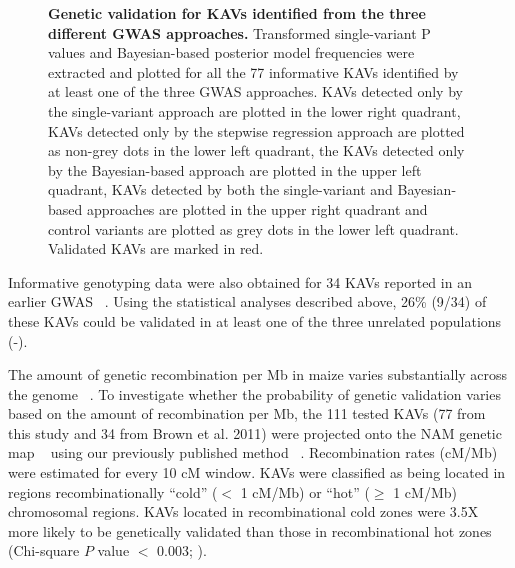\documentclass[10pt,letterpaper]{article}
\begin{document}
\begin{figure}[h]
\caption{{\bf Genetic validation for KAVs identified from the three different GWAS approaches.}
Transformed single-variant P values and Bayesian-based posterior model frequencies were extracted and plotted for all the 77 informative KAVs identified by at least one of the three GWAS approaches. KAVs detected only by the single-variant approach are plotted in the lower right quadrant, KAVs detected only by the stepwise regression approach are plotted as non-grey dots in the lower left quadrant, the KAVs detected only by the Bayesian-based approach are plotted in the upper left quadrant, KAVs detected by both the single-variant and Bayesian-based approaches are plotted in the upper right quadrant and control variants are plotted as grey dots in the lower left quadrant. Validated KAVs are marked in red.}
\label{fig4}
\end{figure}

Informative genotyping data were also obtained for 34 KAVs reported in an earlier GWAS ~\cite{Brown2011}. Using the statistical analyses described above, 26\% (9/34) of these KAVs could be validated in at least one of the three unrelated populations (-).

The amount of genetic recombination per Mb in maize varies substantially across the genome ~\cite{Fu2002}. To investigate whether the probability of genetic validation varies based on the amount of recombination per Mb, the 111 tested KAVs (77 from this study and 34 from Brown et al. 2011) were projected onto the NAM genetic map ~\cite{Buckler2009} using our previously published method ~\cite{Liu2009}. Recombination rates (cM/Mb) were estimated for every 10 cM window. KAVs were classified as being located in regions recombinationally “cold” ($<$ 1 cM/Mb) or “hot” ($\geq$ 1 cM/Mb) chromosomal regions. KAVs located in recombinational cold zones were 3.5X more likely to be genetically validated than those in recombinational hot zones (Chi-square $P$ value $<$ 0.003; ). 
\end{document}
